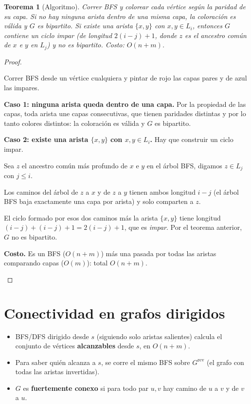 \documentclass[11pt,a4paper]{article}
\theoremstyle{plain}
\newtheorem{teorema}{Teorema}[section]
\theoremstyle{definition}
\theoremstyle{remark}
\begin{document}
\begin{teorema}[Algoritmo]
Correr BFS y colorear cada vértice según la paridad de su capa. Si no hay ninguna
arista dentro de una misma capa, la coloración es válida y $G$ es bipartito. Si existe
una arista $\{x,y\}$ con $x,y\in L_i$, entonces $G$ contiene un ciclo impar (de
longitud $2(i-j)+1$, donde $z$ es el ancestro común de $x$ e $y$ en $L_j$) y no es
bipartito. Costo: $O(n+m)$.
\end{teorema}
\begin{proof}
\begin{pasos}
\item Correr BFS desde un vértice cualquiera y pintar de rojo las capas pares y de azul
las impares.
\item \textbf{Caso 1: ninguna arista queda dentro de una capa.} Por la propiedad de las
capas, toda arista une capas consecutivas, que tienen paridades distintas y por lo tanto
colores distintos: la coloración es válida y $G$ es bipartito.
\item \textbf{Caso 2: existe una arista $\{x,y\}$ con $x,y\in L_i$.} Hay que construir
un ciclo impar.
\item Sea $z$ el ancestro común más profundo de $x$ e $y$ en el árbol BFS, digamos
$z\in L_j$ con $j\le i$.
\item Los caminos del árbol de $z$ a $x$ y de $z$ a $y$ tienen ambos longitud $i-j$
(el árbol BFS baja exactamente una capa por arista) y solo comparten a $z$.
\item El ciclo formado por esos dos caminos más la arista $\{x,y\}$ tiene longitud
$(i-j)+(i-j)+1=2(i-j)+1$, que es \emph{impar}. Por el teorema anterior, $G$ no es
bipartito.
\item \textbf{Costo.} Es un BFS ($O(n+m)$) más una pasada por todas las aristas
comparando capas ($O(m)$): total $O(n+m)$. \qedhere
\end{pasos}
\end{proof}

\section{Conectividad en grafos dirigidos}

\begin{itemize}
\item BFS/DFS dirigido desde $s$ (siguiendo solo aristas salientes) calcula el conjunto
de vértices \textbf{alcanzables} desde $s$, en $O(n+m)$.
\item Para saber quién alcanza a $s$, se corre el mismo BFS sobre $G^{\mathrm{rev}}$
(el grafo con todas las aristas invertidas).
\item $G$ es \textbf{fuertemente conexo} si para todo par $u,v$ hay camino de $u$ a $v$
y de $v$ a $u$.
\end{itemize}
\end{document}
